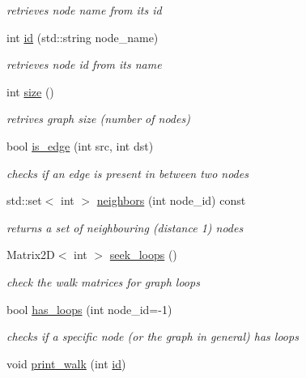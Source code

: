 \begin{DoxyCompactItemize}
\begin{DoxyCompactList}\small\item\em retrieves node name from its id \end{DoxyCompactList}\item 
int \hyperlink{classlitegraph_1_1Graph_a74f404758d946ef99d0fa803ce98ee40}{id} (std\+::string node\+\_\+name)
\begin{DoxyCompactList}\small\item\em retrieves node id from its name \end{DoxyCompactList}\item 
int \hyperlink{classlitegraph_1_1Graph_aaa0517e9ac14a77d552ce635ee9952c3}{size} ()
\begin{DoxyCompactList}\small\item\em retrives graph size (number of nodes) \end{DoxyCompactList}\item 
bool \hyperlink{classlitegraph_1_1Graph_ab45a134fd4a850085e7e709bb3e91764}{is\+\_\+edge} (int src, int dst)
\begin{DoxyCompactList}\small\item\em checks if an edge is present in between two nodes \end{DoxyCompactList}\item 
std\+::set$<$ int $>$ \hyperlink{classlitegraph_1_1Graph_a065ec79ff100c687df78e4e90172e17b}{neighbors} (int node\+\_\+id) const
\begin{DoxyCompactList}\small\item\em returns a set of neighbouring (distance 1) nodes \end{DoxyCompactList}\item 
Matrix2D$<$ int $>$ \hyperlink{classlitegraph_1_1Graph_a0d7fe1dcd24ddf296688b118528e7f4c}{seek\+\_\+loops} ()
\begin{DoxyCompactList}\small\item\em check the walk matrices for graph loops \end{DoxyCompactList}\item 
bool \hyperlink{classlitegraph_1_1Graph_a808c3e69501e924be8f63a9f722dc91b}{has\+\_\+loops} (int node\+\_\+id=-\/1)
\begin{DoxyCompactList}\small\item\em checks if a specific node (or the graph in general) has loops \end{DoxyCompactList}\item 
void \hyperlink{classlitegraph_1_1Graph_ad3e8c02ec87f10d3c2723265e30fc6fc}{print\+\_\+walk} (int \hyperlink{classlitegraph_1_1Graph_a74f404758d946ef99d0fa803ce98ee40}{id})

\end{DoxyCompactItemize}
